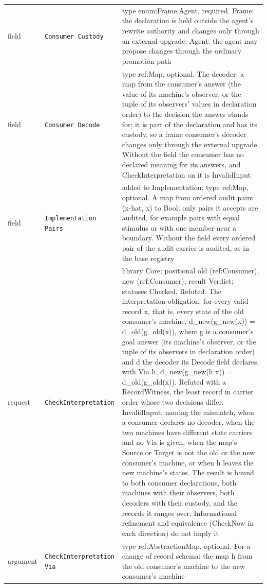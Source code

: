 \documentclass[11pt]{article}
\newcommand{\code}[1]{\texttt{#1}}
\theoremstyle{definition}
\theoremstyle{plain}
\begin{document}
\begin{footnotesize}
\begin{longtable}{>{\raggedright\arraybackslash}p{2.0cm}>{\raggedright\arraybackslash}p{3.6cm}>{\raggedright\arraybackslash}p{8.6cm}}
field & \code{Consumer Custody} & type enum:\allowbreak{}Frame|\allowbreak{}Agent, required. Frame:\allowbreak{} the declaration is held outside the agent's rewrite authority and changes only through an external upgrade; Agent:\allowbreak{} the agent may propose changes through the ordinary promotion path\\
field & \code{Consumer Decode} & type ref:\allowbreak{}Map, optional. The decoder:\allowbreak{} a map from the consumer's answer (the value of its machine's observer, or the tuple of its observers' values in declaration order) to the decision the answer stands for; it is part of the declaration and has its custody, so a frame consumer's decoder changes only through the external upgrade. Without the field the consumer has no declared meaning for its answers, and CheckInterpretation on it is InvalidInput\\
field & \code{Implementation Pairs} & added to Implementation; type ref:\allowbreak{}Map, optional. A map from ordered audit pairs (x-hat, x) to Bool; only pairs it accepts are audited, for example pairs with equal stimulus or with one member near a boundary. Without the field every ordered pair of the audit carrier is audited, as in the base registry\\
request & \code{CheckInterpretation} & library Core; positional old (ref:\allowbreak{}Consumer), new (ref:\allowbreak{}Consumer); result Verdict; statuses Checked, Refuted. The interpretation obligation:\allowbreak{} for every valid record x, that is, every state of the old consumer's machine, d\_new(g\_new(x)) = d\_old(g\_old(x)), where g is a consumer's goal answer (its machine's observer, or the tuple of its observers in declaration order) and d the decoder its Decode field declares; with Via h, d\_new(g\_new(h x)) = d\_old(g\_old(x)). Refuted with a RecordWitness, the least record in carrier order whose two decisions differ. InvalidInput, naming the mismatch, when a consumer declares no decoder, when the two machines have different state carriers and no Via is given, when the map's Source or Target is not the old or the new consumer's machine, or when h leaves the new machine's states. The result is bound to both consumer declarations, both machines with their observers, both decoders with their custody, and the records it ranges over. Informational refinement and equivalence (CheckNow in each direction) do not imply it\\
argument & \code{CheckInterpretation Via} & type ref:\allowbreak{}AbstractionMap, optional. For a change of record schema:\allowbreak{} the map h from the old consumer's machine to the new consumer's machine\\

\end{longtable}
\end{footnotesize}
\end{document}
